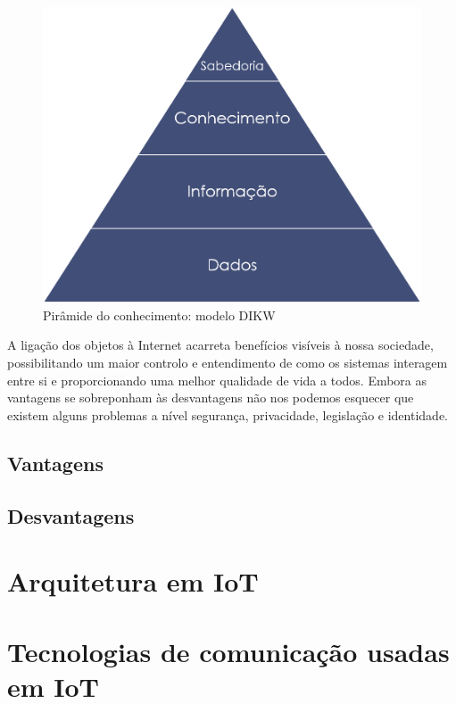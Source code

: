 \begin{figure}[!htb]
	\centering
	\includegraphics[scale=0.3]{img/cap3-iot/dikw.png}
	\caption{Pirâmide do conhecimento: modelo DIKW}
	\label{dikw}
\end{figure}



A ligação dos objetos à Internet acarreta benefícios visíveis à nossa sociedade, possibilitando um maior controlo e entendimento de como os sistemas interagem entre si e proporcionando uma melhor qualidade de vida a todos. Embora as vantagens se sobreponham às desvantagens não nos podemos esquecer que existem alguns problemas a nível segurança, privacidade, legislação e identidade.



\subsection{Vantagens}

\subsection{Desvantagens}


\section{Arquitetura em \ac{IoT}}


\section{Tecnologias de comunicação usadas em \ac{IoT}}

